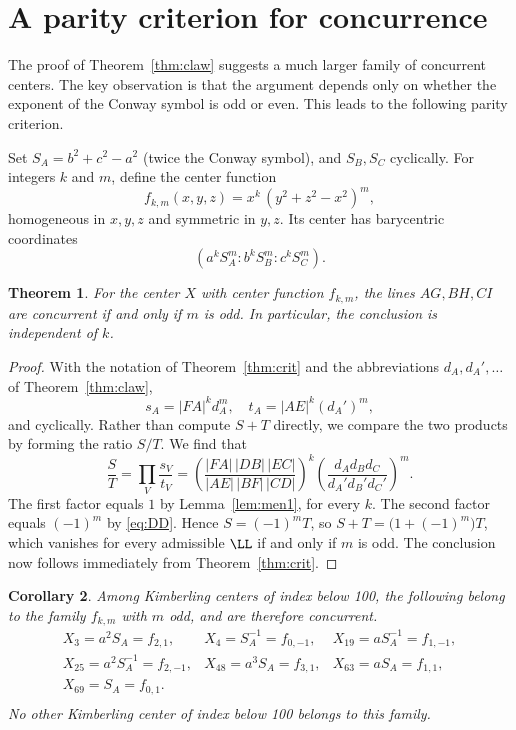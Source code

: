 \documentclass[12pt,a4paper]{amsart}
\newtheorem{theorem}{Theorem} [section]
\newtheorem{corollary}[theorem]{Corollary}
\theoremstyle{remark}
\begin{document}
\section{A parity criterion for concurrence}
\label{sec:parity}

The proof of Theorem~\ref{thm:claw} suggests a much larger family of concurrent centers.
The key observation is that the argument depends only on whether the exponent of
the Conway symbol is odd or even.
This leads to the following parity criterion.

Set $S_A=b^{2}+c^{2}-a^{2}$ (twice the Conway symbol),
and $S_B,S_C$ cyclically.
For integers $k$ and $m$, define the center function
\[
   f_{k,m}(x,y,z)=x^{k}\,(y^{2}+z^{2}-x^{2})^{m},
\]
homogeneous in $x,y,z$ and symmetric in $y,z$.
Its center has barycentric coordinates
$$\left(a^{k}S_A^{m}:b^{k}S_B^{m}:c^{k}S_C^{m}\right).$$

\begin{theorem}
\label{thm:parity}
For the center $X$ with center function $f_{k,m}$, the lines $AG,BH,CI$ are concurrent if
and only if $m$ is odd. In particular, the conclusion is independent of $k$.
\end{theorem}

\begin{proof}
With the notation of Theorem~\ref{thm:crit} and the abbreviations
$d_A,d_A',\dots$ of Theorem~\ref{thm:claw},
\[
  s_A=|FA|^{k}d_A^{m},\quad t_A=|AE|^{k}(d_A')^{m},
\]
and cyclically.
Rather than compute $S+T$ directly, we compare the two products by forming the
ratio $S/T$.
We find that
\[
  \frac{S}{T}=\prod_{V}\frac{s_V}{t_V}
  =\left(\frac{|FA|\,|DB|\,|EC|}{|AE|\,|BF|\,|CD|}\right)^{\!k}
   \left(\frac{d_Ad_Bd_C}{d_A'd_B'd_C'}\right)^{\!m}.
\]
The first factor equals $1$ by Lemma~\ref{lem:men1}, for every $k$. The second factor
equals $(-1)^{m}$ by \eqref{eq:DD}. Hence $S=(-1)^{m}T$, so
$S+T=\bigl(1+(-1)^{m}\bigr)T$, which vanishes for every admissible $\LL$ if and
only if $m$ is odd.
The conclusion now follows immediately from Theorem~\ref{thm:crit}.
\end{proof}

\begin{corollary}\label{cor:list}
Among Kimberling centers of index below 100, the following belong to the family
$f_{k,m}$ with $m$ odd, and are therefore concurrent.
\[
\begin{array}{lll}
  X_3=a^{2}S_A=f_{2,1}, & X_4=S_A^{-1}=f_{0,-1}, & X_{19}=aS_A^{-1}=f_{1,-1},\\[2pt]
  X_{25}=a^{2}S_A^{-1}=f_{2,-1}, & X_{48}=a^3S_A=f_{3,1}, & X_{63}=aS_A=f_{1,1},\\[2pt]
  X_{69}=S_A=f_{0,1}. &  & \\[2pt]
\end{array}
\]
No other Kimberling center of index below 100 belongs to this family.
\end{corollary}
\end{document}
